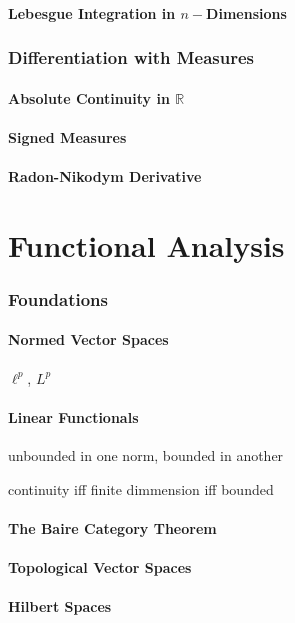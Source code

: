 \documentclass{article}
\newcommand{\R}{\mathbb{R}}
\theoremstyle{definition}
\begin{document}
	\subsection{Lebesgue Integration in $ n- $Dimensions}
	\section{Differentiation with Measures}
	\subsection{Absolute Continuity in $ \R $}
	\subsection{Signed Measures}
	\subsection{Radon-Nikodym Derivative}
	
	\part{Functional Analysis}
	
	\section{Foundations}
	\subsection{Normed Vector Spaces}
	$ \ell^p $, $ L^p $
	\subsection{Linear Functionals}
	unbounded in one norm, bounded in another %
	
	continuity iff finite dimmension iff bounded
	\subsection{The Baire Category Theorem}
	\subsection{Topological Vector Spaces}
	\subsection{Hilbert Spaces}
\end{document}
